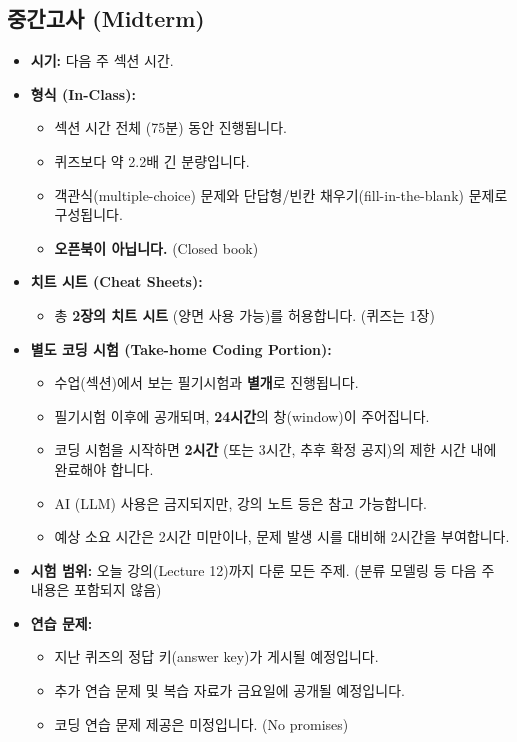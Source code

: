 \documentclass[11pt,a4paper]{book}
\theoremstyle{definition}
\begin{document}
\subsection{중간고사 (Midterm)}
\begin{itemize}
    \item \textbf{시기:} 다음 주 섹션 시간.
    \item \textbf{형식 (In-Class):}
        \begin{itemize}
            \item 섹션 시간 전체 (75분) 동안 진행됩니다.
            \item 퀴즈보다 약 2.2배 긴 분량입니다.
            \item 객관식(multiple-choice) 문제와 단답형/빈칸 채우기(fill-in-the-blank) 문제로 구성됩니다.
            \item \textbf{오픈북이 아닙니다.} (Closed book)
        \end{itemize}
    \item \textbf{치트 시트 (Cheat Sheets):}
        \begin{itemize}
            \item 총 \textbf{2장의 치트 시트} (양면 사용 가능)를 허용합니다. (퀴즈는 1장)
        \end{itemize}
    \item \textbf{별도 코딩 시험 (Take-home Coding Portion):}
        \begin{itemize}
            \item 수업(섹션)에서 보는 필기시험과 \textbf{별개}로 진행됩니다.
            \item 필기시험 이후에 공개되며, \textbf{24시간}의 창(window)이 주어집니다.
            \item 코딩 시험을 시작하면 \textbf{2시간} (또는 3시간, 추후 확정 공지)의 제한 시간 내에 완료해야 합니다.
            \item AI (LLM) 사용은 금지되지만, 강의 노트 등은 참고 가능합니다.
            \item 예상 소요 시간은 2시간 미만이나, 문제 발생 시를 대비해 2시간을 부여합니다.
        \end{itemize}
    \item \textbf{시험 범위:} 오늘 강의(Lecture 12)까지 다룬 모든 주제. (분류 모델링 등 다음 주 내용은 포함되지 않음)
    \item \textbf{연습 문제:}
        \begin{itemize}
            \item 지난 퀴즈의 정답 키(answer key)가 게시될 예정입니다.
            \item 추가 연습 문제 및 복습 자료가 금요일에 공개될 예정입니다.
            \item 코딩 연습 문제 제공은 미정입니다. (No promises)
        \end{itemize}
\end{itemize}
\end{document}
